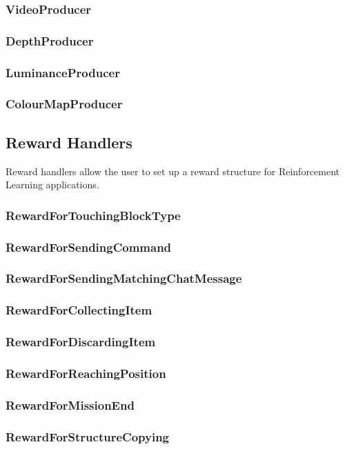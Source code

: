 \documentclass[11pt]{article} %
\begin{document}
\subsubsection{VideoProducer}
\subsubsection{DepthProducer}
\subsubsection{LuminanceProducer}
\subsubsection{ColourMapProducer}

\subsection{Reward Handlers}
Reward handlers allow the user to set up a reward structure for Reinforcement Learning applications.

\subsubsection{RewardForTouchingBlockType}
\subsubsection{RewardForSendingCommand}
\subsubsection{RewardForSendingMatchingChatMessage}
\subsubsection{RewardForCollectingItem}
\subsubsection{RewardForDiscardingItem}
\subsubsection{RewardForReachingPosition}
\subsubsection{RewardForMissionEnd}
\subsubsection{RewardForStructureCopying}
\end{document}
